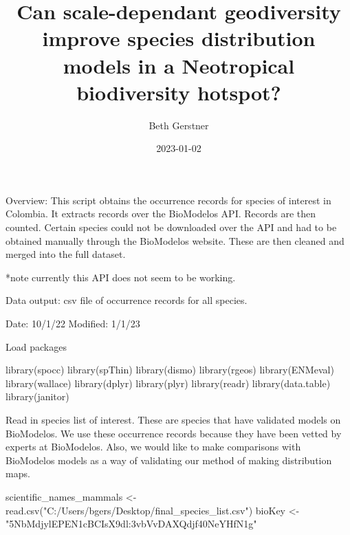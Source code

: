 \documentclass[
]{article}
\title{Can scale-dependant geodiversity improve species distribution
models in a Neotropical biodiversity hotspot?}
\author{Beth Gerstner}
\date{2023-01-02}
\newenvironment{Shaded}{\begin{snugshade}}{\end{snugshade}}
\newcommand{\FunctionTok}[1]{\textcolor[rgb]{0.00,0.00,0.00}{#1}}
\newcommand{\NormalTok}[1]{#1}
\newcommand{\OtherTok}[1]{\textcolor[rgb]{0.56,0.35,0.01}{#1}}
\newcommand{\StringTok}[1]{\textcolor[rgb]{0.31,0.60,0.02}{#1}}
\begin{document}
\maketitle

Overview: This script obtains the occurrence records for species of
interest in Colombia. It extracts records over the BioModelos API.
Records are then counted. Certain species could not be downloaded over
the API and had to be obtained manually through the BioModelos website.
These are then cleaned and merged into the full dataset.

*note currently this API does not seem to be working.

Data output: csv file of occurrence records for all species.

Date: 10/1/22 Modified: 1/1/23

Load packages

\begin{Shaded}
\begin{Highlighting}[]
\FunctionTok{library}\NormalTok{(spocc)}
\FunctionTok{library}\NormalTok{(spThin)}
\FunctionTok{library}\NormalTok{(dismo)}
\FunctionTok{library}\NormalTok{(rgeos)}
\FunctionTok{library}\NormalTok{(ENMeval)}
\FunctionTok{library}\NormalTok{(wallace)}
\FunctionTok{library}\NormalTok{(dplyr)                                                }
\FunctionTok{library}\NormalTok{(plyr)                                                 }
\FunctionTok{library}\NormalTok{(readr)  }
\FunctionTok{library}\NormalTok{(data.table)}
\FunctionTok{library}\NormalTok{(janitor)}
\end{Highlighting}
\end{Shaded}

Read in species list of interest. These are species that have validated
models on BioModelos. We use these occurrence records because they have
been vetted by experts at BioModelos. Also, we would like to make
comparisons with BioModelos models as a way of validating our method of
making distribution maps.

\begin{Shaded}
\begin{Highlighting}[]
\NormalTok{scientific\_names\_mammals }\OtherTok{\textless{}{-}} \FunctionTok{read.csv}\NormalTok{(}\StringTok{"C:/Users/bgers/Desktop/final\_species\_list.csv"}\NormalTok{)}
\NormalTok{bioKey }\OtherTok{\textless{}{-}} \StringTok{"5NbMdjylEPEN1cBCIsX9dl:3vbVvDAXQdjf40NeYHfN1g"}
\end{Highlighting}
\end{Shaded}
\end{document}
